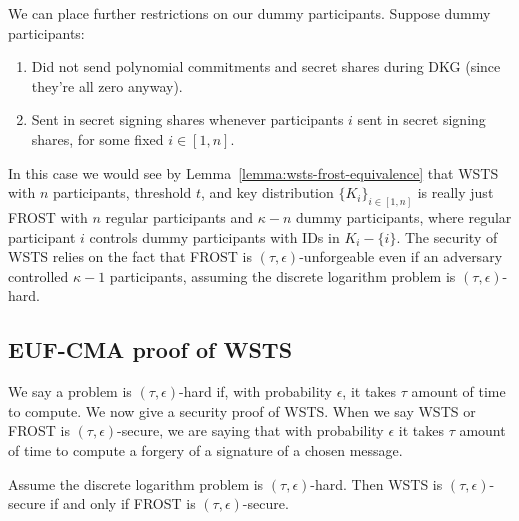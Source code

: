 \documentclass{article}
\begin{document}
\begin{rem}
    We can place further restrictions on our dummy participants. Suppose dummy participants:
    \begin{enumerate}
        \item Did not send polynomial commitments and secret shares during DKG (since they're all zero anyway).
        \item Sent in secret signing shares whenever participants $i$ sent in secret signing shares, for some fixed $i \in [1, n]$.
    \end{enumerate}
    In this case we would see by Lemma~\ref{lemma:wsts-frost-equivalence} that WSTS with $n$ participants, threshold $t$, and key distribution $\{K_i\}_{i\in [1,n]}$ is really just FROST with $n$ regular participants and $\kappa - n$ dummy participants, where regular participant $i$ controls dummy participants with IDs in $K_i - \{ i\}$. The security of WSTS relies on the fact that FROST is $(\tau, \epsilon)$-unforgeable even if an adversary controlled $\kappa - 1$ participants, assuming the discrete logarithm problem is $(\tau, \epsilon)$-hard. 
\end{rem}

\subsection{EUF-CMA proof of WSTS}

We say a problem is $(\tau, \epsilon)$-hard if, with probability $\epsilon$, it takes $\tau$ amount of time to compute. We now give a security proof of WSTS. When we say WSTS or FROST is $(\tau, \epsilon)$-secure, we are saying that with probability $\epsilon$ it takes $\tau$ amount of time to compute a forgery of a signature of a chosen message.

\begin{thm}
    Assume the discrete logarithm problem is $(\tau, \epsilon)$-hard. Then WSTS is $(\tau, \epsilon)$-secure if and only if FROST is $(\tau, \epsilon)$-secure.
\end{thm}
\end{document}
